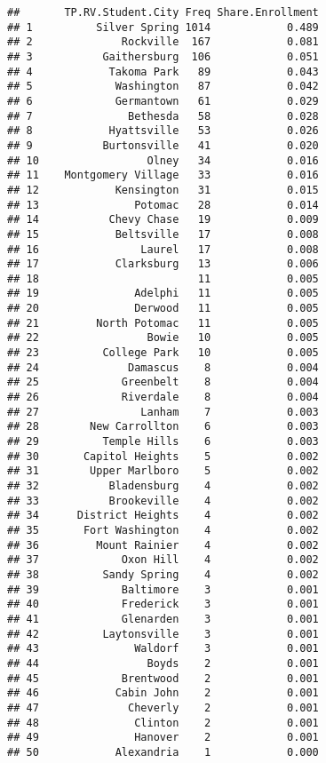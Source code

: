 \documentclass[]{article}
\begin{document}
\begin{verbatim}
##       TP.RV.Student.City Freq Share.Enrollment
## 1          Silver Spring 1014            0.489
## 2              Rockville  167            0.081
## 3           Gaithersburg  106            0.051
## 4            Takoma Park   89            0.043
## 5             Washington   87            0.042
## 6             Germantown   61            0.029
## 7               Bethesda   58            0.028
## 8            Hyattsville   53            0.026
## 9           Burtonsville   41            0.020
## 10                 Olney   34            0.016
## 11    Montgomery Village   33            0.016
## 12            Kensington   31            0.015
## 13               Potomac   28            0.014
## 14           Chevy Chase   19            0.009
## 15            Beltsville   17            0.008
## 16                Laurel   17            0.008
## 17            Clarksburg   13            0.006
## 18                         11            0.005
## 19               Adelphi   11            0.005
## 20               Derwood   11            0.005
## 21         North Potomac   11            0.005
## 22                 Bowie   10            0.005
## 23          College Park   10            0.005
## 24              Damascus    8            0.004
## 25             Greenbelt    8            0.004
## 26             Riverdale    8            0.004
## 27                Lanham    7            0.003
## 28        New Carrollton    6            0.003
## 29          Temple Hills    6            0.003
## 30       Capitol Heights    5            0.002
## 31        Upper Marlboro    5            0.002
## 32           Bladensburg    4            0.002
## 33           Brookeville    4            0.002
## 34      District Heights    4            0.002
## 35       Fort Washington    4            0.002
## 36         Mount Rainier    4            0.002
## 37             Oxon Hill    4            0.002
## 38          Sandy Spring    4            0.002
## 39             Baltimore    3            0.001
## 40             Frederick    3            0.001
## 41             Glenarden    3            0.001
## 42          Laytonsville    3            0.001
## 43               Waldorf    3            0.001
## 44                 Boyds    2            0.001
## 45             Brentwood    2            0.001
## 46            Cabin John    2            0.001
## 47              Cheverly    2            0.001
## 48               Clinton    2            0.001
## 49               Hanover    2            0.001
## 50            Alexandria    1            0.000

\end{verbatim}
\end{document}
